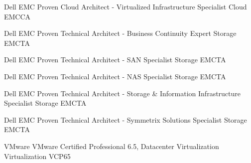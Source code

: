 


\begin{cvhonors}


\cvhonor
{Dell EMC} %
{Proven Cloud Architect - Virtualized Infrastructure Specialist} %
{Cloud} %
{EMCCA}


\cvhonor
{Dell EMC} %
{Proven Technical Architect - Business Continuity Expert} %
{Storage} %
{EMCTA}


\cvhonor
{Dell EMC} %
{Proven Technical Architect - SAN Specialist} %
{Storage} %
{EMCTA}


\cvhonor
{Dell EMC} %
{Proven Technical Architect - NAS Specialist} %
{Storage} %
{EMCTA}


\cvhonor
{Dell EMC} %
{Proven Technical Architect - Storage \& Information Infrastructure Specialist} %
{Storage} %
{EMCTA}


\cvhonor
{Dell EMC} %
{Proven Technical Architect - Symmetrix Solutions Specialist} %
{Storage} %
{EMCTA}


\cvhonor
{VMware} %
{VMware Certified Professional 6.5, Datacenter Virtualization} %
{Virtualization} %
{VCP65}



\end{cvhonors}
